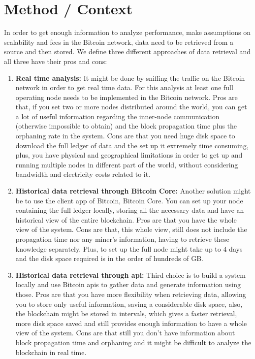 \documentclass[USenglish]{uit-thesis}
\begin{document}
\section{Method / Context}
\label{sec:method}
In order to get enough information to analyze performance,
make assumptions on scalability and fees in the Bitcoin
network, data need to be retrieved from a source and then
stored.
We define three different approaches of data retrieval
and all three have their pros and cons:
\begin{enumerate}
	\item \textbf{Real time analysis:} It might be done by sniffing the traffic
	on the Bitcoin network in order to get real time data.
	For this analysis at least one full operating node
	needs to be implemented in the Bitcoin network.
	Pros are that, if you set two or more nodes distributed around the world,
	you can get a lot of useful information regarding the inner-node
	communication (otherwise impossible to obtain) and the block
	propagation time plus the orphaning rate in the system. Cons are
	that you need huge disk space to download the full ledger of data
	and the set up it extremely time consuming, plus, you have physical
	and geographical limitations
	in order to get up and running multiple nodes
	in different part of the world, without considering bandwidth and electricity
	costs related to it.
	\item \textbf{Historical data retrieval through Bitcoin Core:} Another solution might
	be to use the client app of
	Bitcoin, Bitcoin Core. You can set up your node containing the full ledger
	locally, storing all the necessary data and have an historical view of the
	entire blockchain. Pros are that you have the whole view of the system.
	Cons are that, this whole view, still does not include the propagation time nor
	any miner's information, having to retrieve these knowledge separately.
	Plus, to set up the full node might take up to $4$ days and the
	disk space required is in the order of hundreds of GB.
	\item \textbf{Historical data retrieval through \gls{api}:} Third choice is to build a system
	locally and use Bitcoin \gls{api}s to gather data and generate information
	using those. Pros are that you have more flexibility when retrieving data, allowing
	you to store only useful information, saving a considerable disk space, also,
	the blockchain might be stored in intervals, which gives a faster retrieval,
	more disk space saved and still provides enough information to have a whole
	view of the system. Cons are that still you don't have information about
	block propagation time and orphaning and it might be difficult
	to analyze the blockchain in real time.
\end{enumerate}
\end{document}
